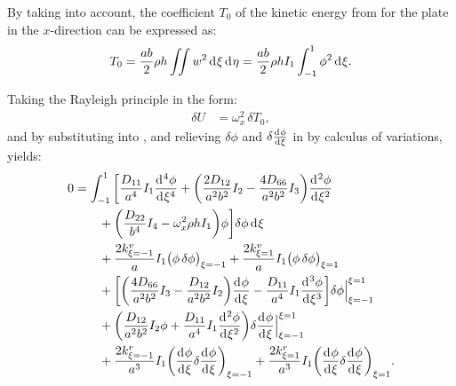 \documentclass[preprint,12pt,number]{elsarticle}
\newcommand{\id}{\mathrm{d}\mkern1mu}
\begin{document}
By taking  into account, the coefficient $T_0$ of the kinetic energy from  for the plate in the $x$-direction can be expressed as:
%
\begin{equation}\label{eq:kine_energyx}
\begin{split}
	T_0 = \frac{ab}{2}\rho h\iint w^2 \, \id \xi \, \id \eta = \frac{ab}{2}\rho h I_1\int_{-1}^{1} \phi^2 \, \id \xi.
\end{split}
\end{equation}

Taking the Rayleigh principle in the form:
%
\begin{equation}\label{eq:Rayleighx}
\begin{split}
	\delta U &= \omega_x^2 \, \delta T_0,
\end{split}
\end{equation}
%
and by substituting  into , and relieving $\delta \phi$ and $\delta\frac{\id  \phi}{\id \xi}$ in  by calculus of variations, yields:
%
\begin{equation}\label{eq:Rayleighx2}
\begin{split}
	0 &= \int_{-1}^{1} \bigg[ \frac{D_{11}}{a^4} I_1 \frac{\id^4 \phi}{\id \xi^4} 
	+ \bigg( \frac{2D_{12}}{a^2b^2} I_2 - \frac{4D_{66}}{a^2b^2} I_3 \bigg) \frac{\id^2 \phi}{\id \xi^2} \\
	&\qquad + \bigg( \frac{D_{22}}{b^4} I_4 - \omega_x^2 \rho h I_1 \bigg) \phi \bigg] \delta \phi \, \id \xi \\
	&\qquad + \frac{2k^v_{\xi=-1}}{a} I_1 \big(\phi\, \delta \phi\big)_{\xi=-1} 
	+ \frac{2k^v_{\xi=1}}{a} I_1 \big(\phi\, \delta \phi\big)_{\xi=1} \\
	&\qquad + \bigg[ \bigg( \frac{4D_{66}}{a^2b^2} I_3 - \frac{D_{12}}{a^2b^2} I_2 \bigg) \frac{\id \phi}{\id \xi} 
	- \frac{D_{11}}{a^4} I_1 \frac{\id^3 \phi}{\id \xi^3} \bigg] \delta \phi \Big|^{\xi=1}_{\xi=-1} \\
	&\qquad + \bigg( \frac{D_{12}}{a^2b^2} I_2 \phi + \frac{D_{11}}{a^4} I_1 \frac{\id^2 \phi}{\id \xi^2} \bigg) 
	\delta\frac{\id  \phi}{\id \xi} \Big|^{\xi=1}_{\xi=-1} \\
	&\qquad + \frac{2k^r_{\xi=-1}}{a^3} I_1 \bigg(\frac{\id \phi}{\id \xi}\delta \frac{\id \phi}{\id \xi}\bigg)_{\xi=-1} 
	+ \frac{2k^r_{\xi=1}}{a^3} I_1 \bigg(\frac{\id \phi}{\id \xi} \delta\frac{\id \phi}{\id \xi}\bigg)_{\xi=1}.
\end{split}
\end{equation}
\end{document}
